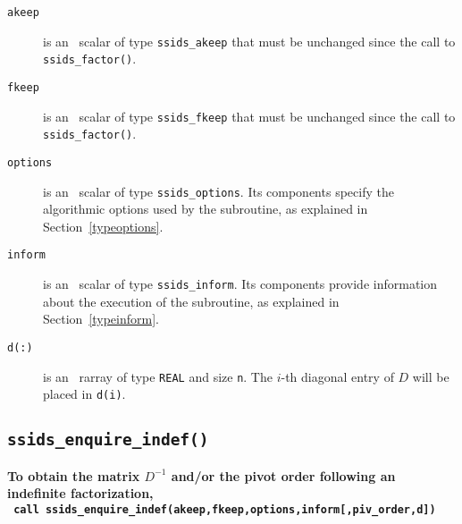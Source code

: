 \documentclass{spral}
\begin{document}
\begin{description}

\item[\texttt{akeep}]  is an \intentin\ scalar of type {\tt ssids\_akeep} that
must be unchanged since the call to {\tt ssids\_factor()}.

\item[\texttt{fkeep}]  is an \intentin\ scalar of type {\tt ssids\_fkeep} that
must be unchanged since the call to {\tt ssids\_factor()}.

\item[\texttt{options}] is an \intentin\ scalar of type {\tt ssids\_options}.
Its components specify the algorithmic options used by the subroutine, as
explained in Section~\ref{typeoptions}.

\item[\texttt{inform}] is an \intentout\ scalar of type
{\tt ssids\_inform}. Its components provide information about the execution
of the subroutine, as explained in Section~\ref{typeinform}.

\item[\texttt{d(:)}] is an  \intentout\ rarray of type {\tt  REAL} and
size {\tt n}. The $i$-th diagonal entry of $D$ will be placed in {\tt d(i)}.

\end{description}

\subsection{\texttt{ssids\_enquire\_indef()}}
\textbf{To obtain the matrix $D^{-1}$ and/or the pivot order following an
   indefinite factorization,
   \vspace*{0.1cm} \\
   \texttt{ \hspace*{0.2cm}
     call ssids\_enquire\_indef(akeep,fkeep,options,inform[,piv\_order,d])
   }
}
\end{document}
